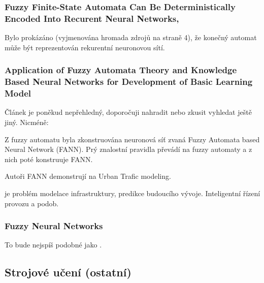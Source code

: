 \documentclass[a4paper,10pt]{article}
\begin{document}
\subsubsection*{Fuzzy Finite-State Automata Can Be Deterministically Encoded Into Recurent Neural Networks, \cite{OmlThoGil-FuzzFinStaAutCanDetEncIntRecNeuNet}}

Bylo prokázáno (vyjmenována hromada zdrojů na straně 4), že konečný automat může být reprezentován rekurentní neuronovou sítí. 



\subsubsection*{Application of Fuzzy Automata Theory and Knowledge Based Neural Networks for Development of Basic Learning Model \cite{DarAhmSin-AppFuzzAutTheKnBsNeuNetDevBasLeaMod}}

Článek je poněkud nepřehledný, doporočuji nahradit \cite{OmlThoGil-FuzzFinStaAutCanDetEncIntRecNeuNet} nebo zkusit vyhledat ještě jiný. Nicméně:

Z fuzzy automatu byla zkonstruována neuronová síť zvaná Fuzzy  Automata  based  Neural  Network (FANN). Prý znalostní pravidla převádí na fuzzy automaty a z nich poté konstruuje FANN.

\begin{definition}
\end{definition}


Autoři FANN demonstrují na Urban Trafic modeling.

\begin{definition}
 je problém modelace infrastruktury, predikce budoucího vývoje. Inteligentní řízení provozu a podob.
\end{definition}

\subsubsection*{Fuzzy Neural Networks \cite{LeeLee-FuzzNeuNet}}

To bude nejspíš podobné jako \cite{DarAhmSin-AppFuzzAutTheKnBsNeuNetDevBasLeaMod}. 


\subsection{Strojové učení (ostatní)}
\end{document}
